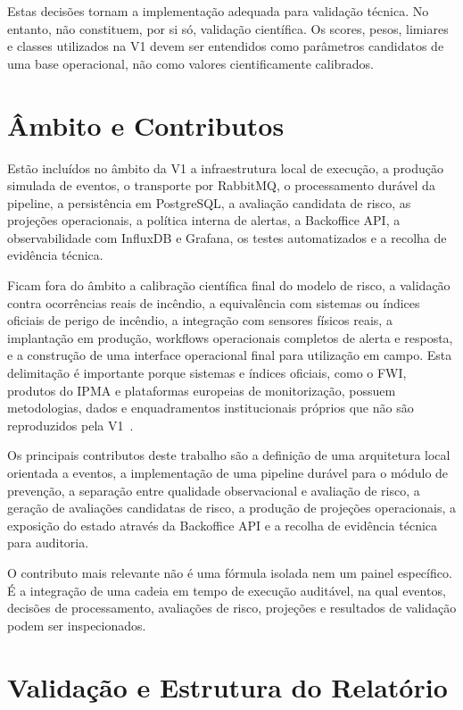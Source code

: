 Estas decisões tornam a implementação adequada para validação técnica. No entanto, não constituem, por si só, validação científica. Os scores, pesos, limiares e classes utilizados na V1 devem ser entendidos como parâmetros candidatos de uma base operacional, não como valores cientificamente calibrados.

\section{Âmbito e Contributos}

Estão incluídos no âmbito da V1 a infraestrutura local de execução, a produção simulada de eventos, o transporte por RabbitMQ, o processamento durável da pipeline, a persistência em PostgreSQL, a avaliação candidata de risco, as projeções operacionais, a política interna de alertas, a Backoffice API, a observabilidade com InfluxDB e Grafana, os testes automatizados e a recolha de evidência técnica.

Ficam fora do âmbito a calibração científica final do modelo de risco, a validação contra ocorrências reais de incêndio, a equivalência com sistemas ou índices oficiais de perigo de incêndio, a integração com sensores físicos reais, a implantação em produção, workflows operacionais completos de alerta e resposta, e a construção de uma interface operacional final para utilização em campo. Esta delimitação é importante porque sistemas e índices oficiais, como o FWI, produtos do IPMA e plataformas europeias de monitorização, possuem metodologias, dados e enquadramentos institucionais próprios que não são reproduzidos pela V1~\citep{ipma_fwi,ipma_pir_rcm,ec_jrc_effis}.

Os principais contributos deste trabalho são a definição de uma arquitetura local orientada a eventos, a implementação de uma pipeline durável para o módulo de prevenção, a separação entre qualidade observacional e avaliação de risco, a geração de avaliações candidatas de risco, a produção de projeções operacionais, a exposição do estado através da Backoffice API e a recolha de evidência técnica para auditoria.

O contributo mais relevante não é uma fórmula isolada nem um painel específico. É a integração de uma cadeia em tempo de execução auditável, na qual eventos, decisões de processamento, avaliações de risco, projeções e resultados de validação podem ser inspecionados.

\section{Validação e Estrutura do Relatório}

